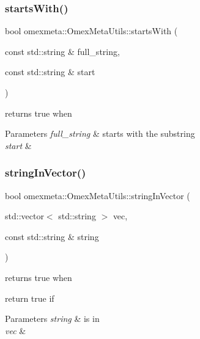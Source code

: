 \subsubsection{\texorpdfstring{starts\+With()}{startsWith()}}
{\footnotesize\ttfamily bool omexmeta\+::\+Omex\+Meta\+Utils\+::starts\+With (\begin{DoxyParamCaption}\item[{const std\+::string \&}]{full\+\_\+string,  }\item[{const std\+::string \&}]{start }\end{DoxyParamCaption})\hspace{0.3cm}{\ttfamily [static]}}



returns true when 


\begin{DoxyParams}{Parameters}
{\em full\+\_\+string} & starts with the substring \\
\hline
{\em start} & \\
\hline
\end{DoxyParams}
\mbox{\label{classomexmeta_1_1OmexMetaUtils_a6f8e406b8798bd2f1f0ae0d1bd07ed2b}} 
\subsubsection{\texorpdfstring{string\+In\+Vector()}{stringInVector()}}
{\footnotesize\ttfamily bool omexmeta\+::\+Omex\+Meta\+Utils\+::string\+In\+Vector (\begin{DoxyParamCaption}\item[{std\+::vector$<$ std\+::string $>$}]{vec,  }\item[{const std\+::string \&}]{string }\end{DoxyParamCaption})\hspace{0.3cm}{\ttfamily [static]}}



returns true when 

return true if


\begin{DoxyParams}{Parameters}
{\em string} & is in \\
\hline
{\em vec} & \\
\hline
\end{DoxyParams}
\mbox{\label{classomexmeta_1_1OmexMetaUtils_aca2230ca99338b9dc0fc7d296b0c553b}} 

